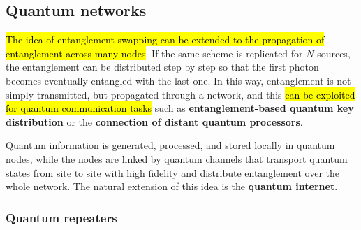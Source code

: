 \subsection{Quantum networks}

\hl{The idea of entanglement swapping can be extended to the propagation of entanglement across many nodes}. If the same scheme is replicated for $N$ sources, the entanglement can be distributed step by step so that the first photon becomes eventually entangled with the last one. In this way, entanglement is not simply transmitted, but propagated through a network, and this \hl{can be exploited for quantum communication tasks} such as \textbf{entanglement-based quantum key distribution} or the \textbf{connection of distant quantum processors}. 

Quantum information is generated, processed, and stored locally in quantum nodes, while the nodes are linked by quantum channels that transport quantum states from site to site with high fidelity and distribute entanglement over the whole network. The natural extension of this idea is the \textbf{quantum internet}.

\subsubsection{Quantum repeaters}

